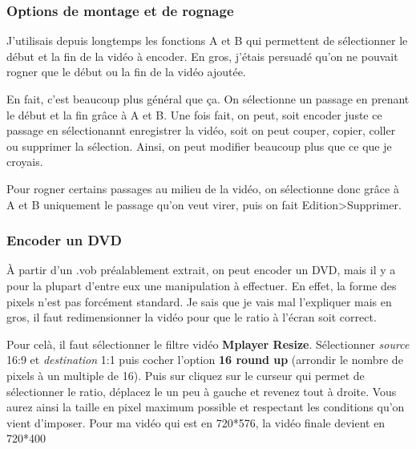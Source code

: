 \documentclass[a4paper,twoside]{article}
\begin{document}
\subsubsection{Options de montage et de rognage}
J'utilisais depuis longtemps les fonctions A et B qui permettent de sélectionner le début et la fin de la vidéo à encoder. En gros, j'étais persuadé qu'on ne pouvait rogner que le début ou la fin de la vidéo ajoutée.

En fait, c'est beaucoup plus général que ça. On sélectionne un passage en prenant le début et la fin grâce à A et B. Une fois fait, on peut, soit encoder juste ce passage en sélectionannt \og enregistrer la vidéo\fg, soit on peut couper, copier, coller ou supprimer la sélection. Ainsi, on peut modifier beaucoup plus que ce que je croyais.

Pour rogner certains passages au milieu de la vidéo, on sélectionne donc grâce à A et B uniquement le passage qu'on veut virer, puis on fait Edition>Supprimer.

\subsubsection{Encoder un DVD}\label{sec:encoder_DVD}
À partir d'un .vob préalablement extrait, on peut encoder un DVD, mais il y a pour la plupart d'entre eux une manipulation à effectuer. En effet, la forme des pixels n'est pas forcément standard. Je sais que je vais mal l'expliquer mais en gros, il faut redimensionner la vidéo pour que le ratio à l'écran soit correct.

Pour celà, il faut sélectionner le filtre vidéo \textbf{Mplayer Resize}. Sélectionner \emph{source} 16:9 et \emph{destination} 1:1 puis cocher l'option \textbf{16 round up} (arrondir le nombre de pixels à un multiple de 16). Puis sur cliquez sur le curseur qui permet de sélectionner le ratio, déplacez le un peu à gauche et revenez tout à droite. Vous aurez ainsi la taille en pixel maximum possible et respectant les conditions qu'on vient d'imposer. Pour ma vidéo qui est en 720*576, la vidéo finale devient en 720*400


\end{document}
